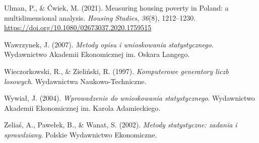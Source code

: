 \documentclass[
  letterpaper,
  DIV=11,
  numbers=noendperiod]{scrreprt}
\newlength{\cslhangindent}
\newenvironment{CSLReferences}[2] %
 {\begin{list}{}{%
  \setlength{\itemindent}{0pt}
  \setlength{\leftmargin}{0pt}
  \setlength{\parsep}{0pt}
  \ifodd #1
   \setlength{\leftmargin}{\cslhangindent}
   \setlength{\itemindent}{-1\cslhangindent}
  \fi
  \setlength{\itemsep}{#2\baselineskip}}}
 {\end{list}}
\begin{document}
\begin{CSLReferences}{1}{0}
Ulman, P., \& Ćwiek, M. (2021). Measuring housing poverty in Poland: a
multidimensional analysis. \emph{Housing Studies}, \emph{36}(8),
1212--1230. \url{https://doi.org/10.1080/02673037.2020.1759515}

Wawrzynek, J. (2007). \emph{Metody opisu i wnioskowania statystycznego}.
Wydawnictwo Akademii Ekonomicznej im. Oskara Langego.

Wieczorkowski, R., \& Zieliński, R. (1997). \emph{Komputerowe generatory
liczb losowych}. Wydawnictwa Naukowo-Techniczne.

Wywiał, J. (2004). \emph{Wprowadzenie do wnioskowania statystycznego}.
Wydawnictwo Akademii Ekonomicznej im. Karola Adamieckiego.

Zeliaś, A., Pawełek, B., \& Wanat, S. (2002). \emph{Metody statystyczne:
zadania i sprawdziany}. Polskie Wydawnictwo Ekonomiczne.

\end{CSLReferences}
\end{document}
